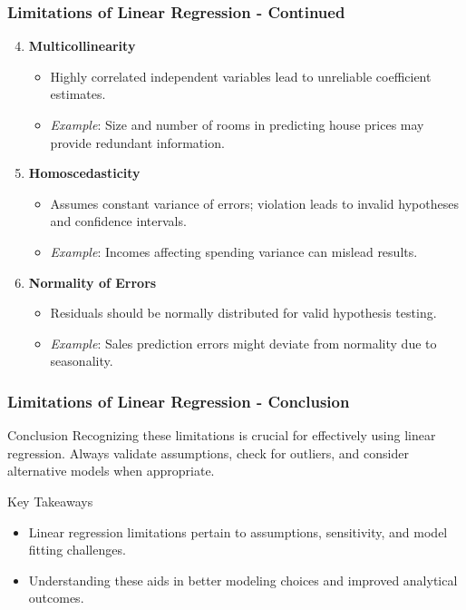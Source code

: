 \documentclass[aspectratio=169]{beamer}
\begin{document}
\begin{frame}[fragile]
    \frametitle{Limitations of Linear Regression - Continued}
    \begin{enumerate}
        \setcounter{enumi}{3} %
        \item \textbf{Multicollinearity}
            \begin{itemize}
                \item Highly correlated independent variables lead to unreliable coefficient estimates.
                \item \textit{Example}: Size and number of rooms in predicting house prices may provide redundant information.
            \end{itemize}
        \item \textbf{Homoscedasticity}
            \begin{itemize}
                \item Assumes constant variance of errors; violation leads to invalid hypotheses and confidence intervals.
                \item \textit{Example}: Incomes affecting spending variance can mislead results.
            \end{itemize}
        \item \textbf{Normality of Errors}
            \begin{itemize}
                \item Residuals should be normally distributed for valid hypothesis testing.
                \item \textit{Example}: Sales prediction errors might deviate from normality due to seasonality.
            \end{itemize}
    \end{enumerate}
\end{frame}

\begin{frame}[fragile]
    \frametitle{Limitations of Linear Regression - Conclusion}
    \begin{block}{Conclusion}
        Recognizing these limitations is crucial for effectively using linear regression. Always validate assumptions, check for outliers, and consider alternative models when appropriate.
    \end{block}
    \begin{block}{Key Takeaways}
        \begin{itemize}
            \item Linear regression limitations pertain to assumptions, sensitivity, and model fitting challenges.
            \item Understanding these aids in better modeling choices and improved analytical outcomes.
        \end{itemize}
    \end{block}
\end{frame}
\end{document}
